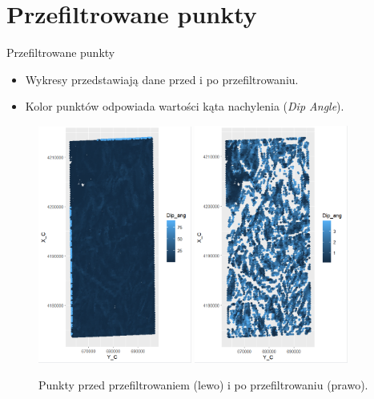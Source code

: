 \documentclass{beamer}
\begin{document}
\section{Przefiltrowane punkty}
\begin{frame}{Przefiltrowane punkty}
    \begin{itemize}
        \item Wykresy przedstawiają dane przed i po przefiltrowaniu.
        \item Kolor punktów odpowiada wartości kąta nachylenia (\textit{Dip Angle}).
    \end{itemize}
    \begin{figure}
        \centering
        \includegraphics[width=0.45\textwidth]{before.png}
        \includegraphics[width=0.45\textwidth]{after.png}
        \caption{Punkty przed przefiltrowaniem (lewo) i po przefiltrowaniu (prawo).}
    \end{figure}
\end{frame}
\end{document}
